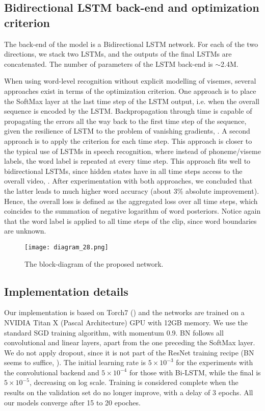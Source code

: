 \documentclass[a4paper]{article}
\begin{document}
\subsection{Bidirectional LSTM back-end and optimization criterion}
The back-end of the model is a Bidirectional LSTM network. For each of the two directions, we stack two LSTMs, and the outputs of the final LSTMs are concatenated. The number of parameters of the LSTM back-end is $\sim$2.4M. 

When using word-level recognition without explicit modelling of visemes, several approaches exist in terms of the optimization criterion. One approach is to place the SoftMax layer at the last time step of the LSTM output, i.e. when the overall sequence is encoded by the LSTM. Backpropagation through time is capable of propagating the errors all the way back to the first time step of the sequence, given the resilience of LSTM to the problem of vanishing gradients, \cite{wand2016lipreading}. A second approach is to apply the criterion for each time step. This approach is closer to the typical use of LSTMs in speech recognition, where instead of phoneme/viseme labels, the word label is repeated at every time step. This approach fits well to bidirectional LSTMs, since hidden states have in all time steps access to the overall video, \cite{graves2005bidirectional}. After experimentation with both approaches, we concluded that the latter leads to much higher word accuracy (about 3\% absolute improvement). Hence, the overall loss is defined as the aggregated loss over all time steps, which coincides to the summation of negative logarithm of word posteriors. Notice again that the word label is applied to all time steps of the clip, since word boundaries are unknown. 
\begin{figure}[!htbp]
\centering
\texttt{[image: diagram\_28.png]}
\vspace{-2mm}\caption{The block-diagram of the proposed network.}
\label{diagram}
\end{figure}
\subsection{Implementation details}
Our implementation is based on Torch7 (\cite{torch7}) and the networks are trained on a NVIDIA Titan X (Pascal Architecture) GPU with 12GB memory. We use the standard SGD training algorithm, with momentum 0.9. BN follows all convolutional and linear layers, apart from the one preceding the SoftMax layer. We do not apply dropout, since it is not part of the ResNet training recipe (BN seems to suffice, \cite{ioffe2015batch}). The initial learning rate is $5\times10^{-3}$ for the experiments with the convolutional backend and $5\times10^{-4}$ for those with Bi-LSTM, while the final is $5\times10^{-5}$, decreasing on log scale. Training is considered complete when the results on the validation set do no longer improve, with a delay of 3 epochs. All our models converge after 15 to 20 epoches. 
\end{document}
